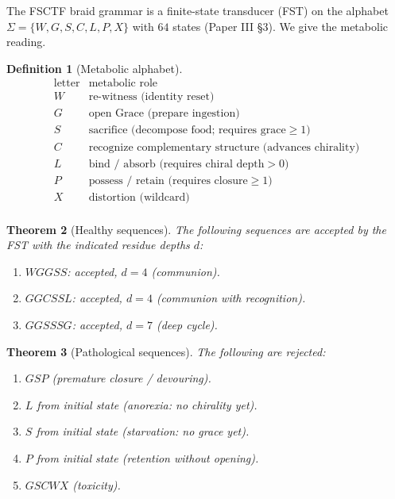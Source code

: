 \documentclass[11pt,a4paper]{article}
\theoremstyle{plain}
\newtheorem{theorem}{Theorem}[section]
\theoremstyle{definition}
\newtheorem{definition}[theorem]{Definition}
\theoremstyle{remark}
\numberwithin{equation}{section}
\begin{document}
The FSCTF braid grammar is a finite-state transducer (FST) on the
alphabet $\Sigma = \{W, G, S, C, L, P, X\}$ with $64$ states (Paper
III §3). We give the metabolic reading.

\begin{definition}[Metabolic alphabet]
\label{def:alphabet}
\[
\begin{array}{c|l}
\text{letter} & \text{metabolic role} \\
\hline
W & \text{re-witness (identity reset)} \\
G & \text{open Grace (prepare ingestion)} \\
S & \text{sacrifice (decompose food; requires grace} \geq 1\text{)} \\
C & \text{recognize complementary structure (advances chirality)} \\
L & \text{bind / absorb (requires chiral depth} > 0\text{)} \\
P & \text{possess / retain (requires closure} \geq 1\text{)} \\
X & \text{distortion (wildcard)} \\
\end{array}
\]
\end{definition}

\begin{theorem}[Healthy sequences]
\label{thm:healthy}
The following sequences are accepted by the FST with the indicated
residue depths $d$:
\begin{enumerate}[label=(\roman*)]
\item $W G G S S$: accepted, $d = 4$ (communion).
\item $G G C S S L$: accepted, $d = 4$ (communion with recognition).
\item $G G S S S G$: accepted, $d = 7$ (deep cycle).
\end{enumerate}
\end{theorem}

\begin{theorem}[Pathological sequences]
\label{thm:pathological}
The following are rejected:
\begin{enumerate}[label=(\roman*)]
\item $G S P$ (premature closure / devouring).
\item $L$ from initial state (anorexia: no chirality yet).
\item $S$ from initial state (starvation: no grace yet).
\item $P$ from initial state (retention without opening).
\item $G S C W X$ (toxicity).
\end{enumerate}
\end{theorem}
\end{document}
